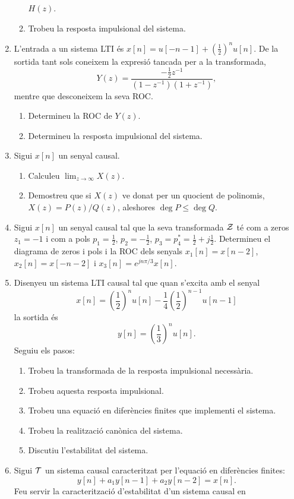 \documentclass[a4paper,12pt]{article}
\newcommand\cT{{\cal T}}
\newcommand\cZ{{\cal Z}}
\begin{document}
\begin{enumerate}
\begin{enumerate}
    $H(z)$.
  \item Trobeu la resposta impulsional del sistema.
  \end{enumerate}
\item L'entrada a un sistema LTI és
  $x[n]=u[-n-1]+(\frac12)^nu[n]$. De la sortida tant sols coneixem la
  expresió tancada per a la transformada,
  $$Y(z)=\frac{-\frac12 z^{-1}}{(1-z^{-1})(1+z^{-1})},$$
  mentre que desconeixem la seva ROC.
  \begin{enumerate}
  \item Determineu la ROC de $Y(z)$.
  \item Determineu la resposta impulsional del sistema.
  \end{enumerate}
  \newpage{}
\item Sigui $x[n]$ un senyal causal.
  \begin{enumerate}
  \item Calculeu $\lim_{z\to\infty}X(z)$.
  \item Demostreu que si $X(z)$ ve donat per un quocient de polinomis,
    $X(z)=P(z)/Q(z)$, aleshores $\deg P\le \deg Q$.
  \end{enumerate}
\item Sigui $x[n]$ un senyal causal tal que la seva transformada $\cZ$
  té com a zeros $z_1=-1$ i  com a pols $p_1=\frac12$, $p_2=-\frac12$,
  $p_3=p_4^*=\frac12+j\frac12$.
  Determineu el diagrama de zeros i pols i la ROC dels senyals
  $x_1[n]=x[n-2]$, $x_2[n]=x[-n-2]$ i $x_3[n]=e^{jn\pi/3}x[n]$.
\item Disenyeu un sistema LTI causal tal que quan s'excita amb el
  senyal
  $$x[n]=\left(\frac12\right)^n
  u[n]-\frac14\left(\frac12\right)^{n-1}u[n-1]$$
  la sortida és
  $$y[n]=\left(\frac13\right)^nu[n].$$
  Seguiu els pasos:
  \begin{enumerate}
  \item Trobeu la transformada de la resposta impulsional necessària.
  \item Trobeu aquesta resposta impulsional.
  \item Trobeu una equació en diferències finites que implementi el
    sistema.
  \item Trobeu la realització canònica del sistema.
  \item Discutiu l'estabilitat del sistema.
  \end{enumerate}
\item Sigui $\cT$ un sistema causal caracteritzat per l'equació en
  diferències finites:
  $$y[n]+a_1y[n-1]+a_2y[n-2]=x[n].$$
  Feu servir la caracterització d'estabilitat d'un sistema causal en

\end{enumerate}
\end{document}
